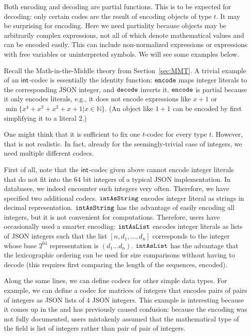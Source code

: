 Both encoding and decoding are partial functions.
This is to be expected for decoding: only certain codes are the result of encoding objects of type $t$.
It may be surprising for encoding.
Here we need partiality because \MMT objects may be arbitrarily complex expressions, not all of which denote mathematical values and can be encoded easily.
This can include non-normalized expressions or expressions with free variables or uninterpreted symbols.
We will see some examples below.

Recall the Math-in-the-Middle theory from Section~\ref{sec:MMT}.
A trivial example of an $\Int$-codec is essentially the identity function: $\enc$ maps integer literals to the corresponding JSON integer, and $\dec$ inverts it.
$\enc$ is partial because it only encodes literals, e.g., it does not encode expressions like $x+1$ or $\min \{x^4+x^3+x^2+x+1|x\in \mathbb{N}\}$.
(An object like $1+1$ can be encoded by first simplifying it to a literal $2$.)

One might think that it is sufficient to fix one $t$-codec for every type $t$.
However, that is not realistic.
In fact, already for the seemingly-trivial case of integers, we need multiple different codecs.

First of all, note that the $\Int$-codec given above cannot encode integer literals that do not fit into the $64$ bit integers of a typical JSON implementation.
In \LMFDB databases, we indeed encounter such integers very often.
Therefore, we have specified two additional codecs.
$\intAsString$ encodes integer literal as strings in decimal representation.
$\intAsString$ has the advantage of easily encoding all integers, but it is not
convenient for computations.  Therefore, \LMFDB users have occasionally used a smarter
encoding: $\intAsList$ encodes integer literals as lists of JSON integers such that the
list $[n,d_1,\ldots,d_n]$ corresponds to the integer whose base $2^{64}$ representation is
$(d_1\ldots d_n)$.  $\intAsList$ has the advantage that the lexicographic ordering can be
used for size comparisons without having to decode (this requires first comparing the length of the sequences, encoded).

Along the same lines, we can define codecs for other simple data types.
For example, we can define a codec for matrices of integers that encodes pairs of pairs of integers as JSON lists of $4$ JSON integers.
This example is interesting because it comes up in the \LMFDB and has previously caused confusion: because the encoding was not fully documented, users mistakenly assumed that the mathematical type of the field is list of integers rather than pair of pair of integers.

